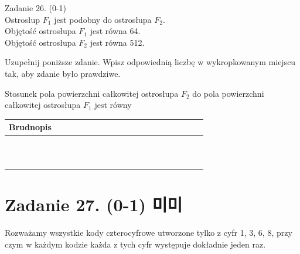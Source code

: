 \documentclass[10pt]{article}
\begin{document}
Zadanie 26. (0-1)\\
Ostrosłup \(F_{1}\) jest podobny do ostrosłupa \(F_{2}\).\\
Objętość ostrosłupa \(F_{1}\) jest równa 64.\\
Objętość ostrosłupa \(F_{2}\) jest równa 512.

Uzupełnij poniższe zdanie. Wpisz odpowiednią liczbę w wykropkowanym miejscu tak, aby zdanie było prawdziwe.

Stosunek pola powierzchni całkowitej ostrosłupa \(F_{2}\) do pola powierzchni całkowitej ostrosłupa \(F_{1}\) jest równy \(\qquad\)

\begin{center}
\begin{tabular}{|c|c|c|c|c|c|c|c|c|c|c|c|c|c|c|c|c|c|c|c|c|c|}
\hline
\multicolumn{4}{|l|}{Brudnopis} &  &  &  &  &  &  &  &  &  &  &  &  &  &  &  &  &  &  \\
\hline
 &  &  &  &  &  &  &  &  &  &  &  &  &  &  &  &  &  &  &  &  &  \\
\hline
 &  &  &  &  &  &  &  &  &  &  &  &  &  &  &  &  &  &  &  &  &  \\
\hline
 &  &  &  &  &  &  &  &  &  &  &  &  &  &  &  &  &  &  &  &  &  \\
\hline
 &  &  &  &  &  &  &  &  &  &  &  &  &  &  &  &  &  &  &  &  &  \\
\hline
 &  &  &  &  &  &  &  &  &  &  &  &  &  &  &  &  &  &  &  &  &  \\
\hline
 &  &  &  &  &  &  &  &  &  &  &  &  &  &  &  &  &  &  &  &  &  \\
\hline
 &  &  &  &  &  &  &  &  &  &  &  &  &  &  &  &  &  &  &  &  &  \\
\hline
 &  &  &  &  &  &  &  &  &  &  &  &  &  &  &  &  &  &  &  &  &  \\
\hline
 &  &  &  &  &  &  &  &  &  &  &  &  &  &  &  &  &  &  &  &  &  \\
\hline
 &  &  &  &  &  &  &  &  &  &  &  &  &  &  &  &  &  &  &  &  &  \\
\hline
 &  &  &  &  &  &  &  &  &  &  &  &  &  &  &  &  &  &  &  &  &  \\
\hline
\end{tabular}
\end{center}

\section*{Zadanie 27. (0-1) 미미}
Rozważamy wszystkie kody czterocyfrowe utworzone tylko z cyfr 1, 3, 6, 8, przy czym w każdym kodzie każda z tych cyfr występuje dokładnie jeden raz.
\end{document}
